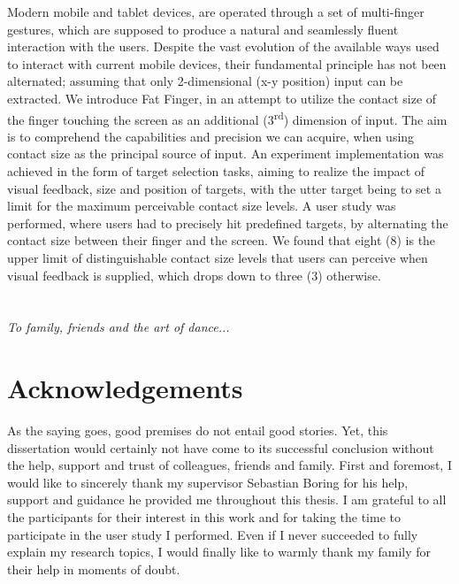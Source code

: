 \documentclass[10pt,twoside]{report}
\begin{document}
Modern mobile and tablet devices, are operated through a set of multi-finger gestures, which are supposed to produce a natural and seamlessly fluent interaction with the users. Despite the vast evolution of the available ways used to interact with current mobile devices, their fundamental principle has not been alternated; assuming that only 2-dimensional (x-y position) input can be extracted. We introduce Fat Finger, in an attempt to utilize the contact size of the finger touching the screen as an additional (3\textsuperscript{rd}) dimension of input. The aim is to comprehend the capabilities and precision we can acquire, when using contact size as the principal source of input.
An experiment implementation was achieved in the form of target selection tasks, aiming to realize the impact of visual feedback, size and position of targets, with the utter target being to set a limit for the maximum perceivable contact size levels.
A user study was performed, where users had to precisely hit predefined targets, by alternating the contact size between their finger and the screen. We found that eight (8) is the upper limit of distinguishable contact size levels that users can perceive when visual feedback is supplied, which drops down to three (3) otherwise.





\cleardoublepage

\chapter*{}
\Large
\vspace{5cm}
\emph{To family, friends and the art of dance...}
\cleardoublepage



\normalsize
\chapter*{Acknowledgements}

As the saying goes, good premises do not entail good stories. Yet, this dissertation would certainly not have come to its successful conclusion without the help, support and trust of colleagues, friends and family.
First and foremost, I would like to sincerely thank my supervisor Sebastian Boring for his help, support and guidance he provided me throughout this thesis.
I am grateful to all the participants for their interest in this work and for taking the time to participate in the user study I performed.
Even if I never succeeded to fully explain my research topics, I would finally like to warmly thank my family for their help in moments of doubt.
\cleardoublepage
\end{document}
